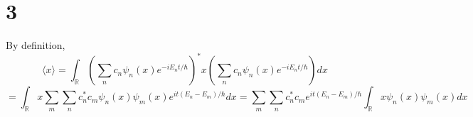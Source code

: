 \documentclass{article}
\begin{document}
\section*{3}
By definition,
\[\langle x \rangle=\int_{\mathbb{R}}\left( \sum_{n}c_{n}\psi_{n}(x)e^{-iE_{n} t/\hbar} \right)^{*}x
  \left( \sum_{n}c_{n}\psi_{n}(x)e^{-iE_{n} t/\hbar} \right)dx\]
\[
  =\int_{\mathbb{R}}x\sum_{m}\sum_{n}c_{n}^{*}c_{m}\psi_{n}(x)\psi_{m}(x)e^{it(E_{n}-E_{m})/\hbar}dx
  =\sum_{m}\sum_{n}c_{n}^{*}c_{m}e^{it(E_{n}-E_{m})/\hbar}\int_{\mathbb{R}}x\psi_{n}(x)\psi_{m}(x)dx
\]

\end{document}
